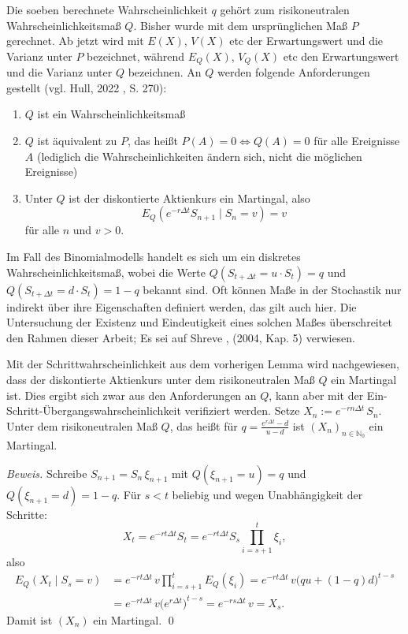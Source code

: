 \begin{defi}
Die soeben berechnete Wahrscheinlichkeit $q$ gehört zum risikoneutralen Wahrscheinlichkeitsmaß $Q$.
Bisher wurde mit dem ursprünglichen Maß $P$ gerechnet. Ab jetzt wird mit $E(X)$, $V(X)$ etc der Erwartungswert
und die Varianz unter $P$ bezeichnet, während $E_Q(X)$, $V_Q(X)$ etc den Erwartungswert und die Varianz unter $Q$
bezeichnen. An $Q$ werden folgende Anforderungen gestellt (vgl. Hull, 2022 \cite{hull}, S. 270):
\begin{enumerate}
    \item $Q$ ist ein Wahrscheinlichkeitsmaß
    \item $Q$ ist äquivalent zu $P$, das heißt $P(A)=0 \iff Q(A)=0$ für alle Ereignisse $A$ (lediglich die Wahrscheinlichkeiten ändern sich, nicht die möglichen Ereignisse)
    \item Unter $Q$ ist der diskontierte Aktienkurs ein Martingal, also $$E_Q(e^{-r \Delta t} S_{n+1} \mid S_n = v) = v$$ für alle $n$ und $v>0$.
\end{enumerate}
Im Fall des Binomialmodells handelt es sich um ein diskretes Wahrscheinlichkeitsmaß, 
wobei die Werte $Q(S_{t + \Delta t} = u \cdot S_t)=q$ und $Q(S_{t + \Delta t} = d \cdot S_t)=1-q$ bekannt sind.
Oft können Maße in der Stochastik nur indirekt über ihre Eigenschaften definiert werden, das gilt auch hier. Die Untersuchung der Existenz und Eindeutigkeit eines solchen Maßes überschreitet den Rahmen dieser Arbeit; Es sei auf Shreve \cite{shreve}, (2004, Kap. 5) verwiesen.
\end{defi}

\begin{lemma}
Mit der Schrittwahrscheinlichkeit aus dem vorherigen Lemma wird nachgewiesen,
dass der diskontierte Aktienkurs unter dem risikoneutralen Maß $Q$ ein Martingal ist. Dies ergibt sich zwar aus den Anforderungen 
an $Q$, kann aber mit der Ein-Schritt-Übergangswahrscheinlichkeit verifiziert werden.
Setze $X_n := e^{-r n \Delta t}\, S_n$. Unter dem risikoneutralen Maß $Q$, das heißt für 
$q=\frac{e^{r\Delta t}-d}{u-d}$ ist $(X_n)_{n\in\mathbb N_0}$ ein Martingal.

\textit{Beweis.} Schreibe $S_{n+1}=S_n\,\xi_{n+1}$ mit 
$Q(\xi_{n+1}=u)=q$ und $Q(\xi_{n+1}=d)=1-q$. 
Für $s<t$ beliebig und wegen Unabhängigkeit der Schritte:
$$
X_t
= e^{-rt\Delta t} S_t
= e^{-rt\Delta t} S_s \prod_{i=s+1}^{t} \xi_i,
$$
also
$$
\begin{aligned}
E_Q(X_t\mid S_s=v)
&= e^{-rt\Delta t}\, v \prod_{i=s+1}^{t} E_Q(\xi_i)
= e^{-rt\Delta t}\, v \big(q u + (1-q)d\big)^{t-s} \\
&= e^{-rt\Delta t}\, v \big(e^{r\Delta t}\big)^{t-s}
= e^{-rs\Delta t}\, v
= X_s.
\end{aligned}
$$
Damit ist $(X_n)$ ein Martingal. \qed
\end{lemma}

